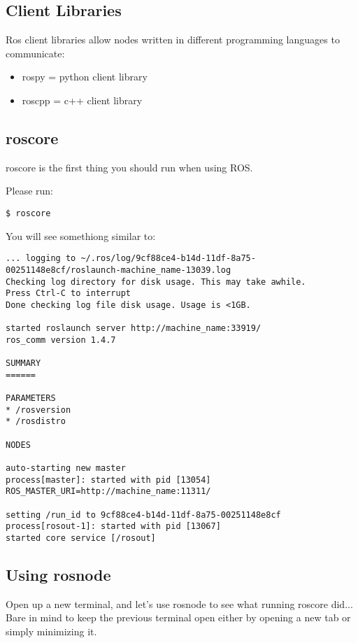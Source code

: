 \subsection{Client Libraries}
Ros client libraries allow nodes written in different programming languages to communicate:
\begin{itemize}
	\item rospy = python client library
	\item roscpp = c++ client library
\end{itemize}

\subsection{roscore}

roscore is the first thing you should run when using ROS.

Please run:
\begin{lstlisting}[breaklines=true languages=bash]
$ roscore
\end{lstlisting}

You will see somethiong similar to:

\begin{lstlisting}[breaklines=true languages=bash]
... logging to ~/.ros/log/9cf88ce4-b14d-11df-8a75-00251148e8cf/roslaunch-machine_name-13039.log
Checking log directory for disk usage. This may take awhile.
Press Ctrl-C to interrupt
Done checking log file disk usage. Usage is <1GB.

started roslaunch server http://machine_name:33919/
ros_comm version 1.4.7

SUMMARY
======

PARAMETERS
* /rosversion
* /rosdistro

NODES

auto-starting new master
process[master]: started with pid [13054]
ROS_MASTER_URI=http://machine_name:11311/

setting /run_id to 9cf88ce4-b14d-11df-8a75-00251148e8cf
process[rosout-1]: started with pid [13067]
started core service [/rosout]
\end{lstlisting}

\subsection{Using rosnode}
Open up a new terminal, and let's use rosnode to see what running roscore did... Bare in mind to keep the previous terminal open either by opening a new tab or simply minimizing it.

